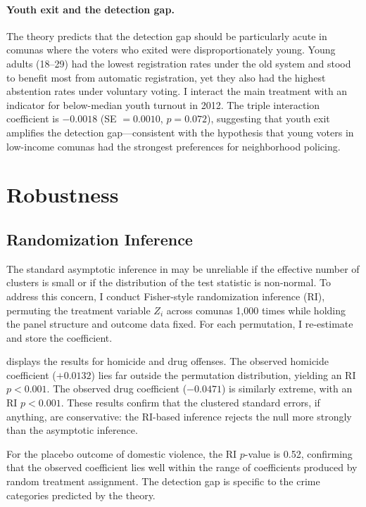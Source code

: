 \documentclass[12pt]{article}
\begin{document}
\paragraph{Youth exit and the detection gap.} The theory predicts that the detection gap should be particularly acute in comunas where the voters who exited were disproportionately young. Young adults (18--29) had the lowest registration rates under the old system and stood to benefit most from automatic registration, yet they also had the highest abstention rates under voluntary voting. I interact the main treatment with an indicator for below-median youth turnout in 2012. The triple interaction coefficient is $-0.0018$ (SE $= 0.0010$, $p = 0.072$), suggesting that youth exit amplifies the detection gap---consistent with the hypothesis that young voters in low-income comunas had the strongest preferences for neighborhood policing.


\section{Robustness}\label{sec:robustness}

\subsection{Randomization Inference}

The standard asymptotic inference in  may be unreliable if the effective number of clusters is small or if the distribution of the test statistic is non-normal. To address this concern, I conduct Fisher-style randomization inference (RI), permuting the treatment variable $Z_i$ across comunas 1,000 times while holding the panel structure and outcome data fixed. For each permutation, I re-estimate  and store the coefficient.

 displays the results for homicide and drug offenses. The observed homicide coefficient ($+0.0132$) lies far outside the permutation distribution, yielding an RI $p < 0.001$. The observed drug coefficient ($-0.0471$) is similarly extreme, with an RI $p < 0.001$. These results confirm that the clustered standard errors, if anything, are conservative: the RI-based inference rejects the null more strongly than the asymptotic inference.

For the placebo outcome of domestic violence, the RI $p$-value is 0.52, confirming that the observed coefficient lies well within the range of coefficients produced by random treatment assignment. The detection gap is specific to the crime categories predicted by the theory.
\end{document}
